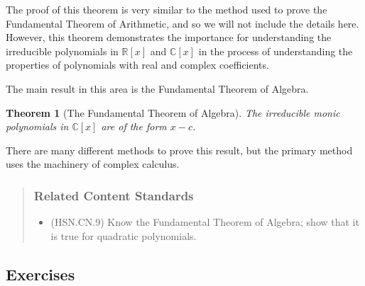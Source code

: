 \documentclass[
]{book}
\providecommand{\tightlist}{%
  \setlength{\itemsep}{0pt}\setlength{\parskip}{0pt}}
\newtheorem{theorem}{Theorem}[chapter]
\theoremstyle{definition}
\theoremstyle{definition}
\theoremstyle{definition}
\theoremstyle{remark}
\begin{document}
The proof of this theorem is very similar to the method used to prove the Fundamental Theorem of Arithmetic, and so we will not include the details here. However, this theorem demonstrates the importance for understanding the irreducible polynomials in \(\mathbb{R}[x]\) and \(\mathbb{C}[x]\) in the process of understanding the properties of polynomials with real and complex coefficients.

The main result in this area is the Fundamental Theorem of Algebra.

\begin{theorem}[The Fundamental Theorem of Algebra]
\protect\hypertarget{thm:unnamed-chunk-206}{}{\label{thm:unnamed-chunk-206} {} }The irreducible monic polynomials in \(\mathbb{C}[x]\) are of the form \(x-c\).
\end{theorem}

There are many different methods to prove this result, but the primary method uses the machinery of complex calculus.

\begin{quote}
\hypertarget{related-content-standards-34}{%
\subsubsection*{Related Content Standards}\label{related-content-standards-34}}

\begin{itemize}
\tightlist
\item
  (HSN.CN.9) Know the Fundamental Theorem of Algebra; show that it is true for quadratic polynomials.
\end{itemize}
\end{quote}

\hypertarget{exercises-25}{%
\subsection{Exercises}\label{exercises-25}}
\end{document}

